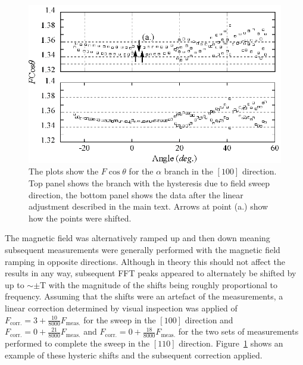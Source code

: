 \begin{figure}[htbp]
    \begin{center}
        \includegraphics[scale=0.9]{Chapter-dHvABaFe2P2/Figures/AngleDepMeasurements/HysteresisCorrection/HysteresisCorrection}
        \caption{The plots show the $F\cos \theta$ for the $\alpha$ branch in the $[100]$ direction. Top panel shows the branch with the hysteresis due to field sweep direction, the bottom panel shows the data after the linear adjustment described in the main text. Arrows at point (a.) show how the points were shifted.}
        \label{Fig:ResD:HysteresisCorrection}
    \end{center}
\end{figure}

The magnetic field was alternatively ramped up and then down meaning subsequent measurements were generally performed with the magnetic field ramping in opposite directions. Although in theory this should not affect the results in any way, subsequent \ac{FFT} peaks appeared to alternately be shifted by up to $\sim\pm$\unit[21]{T} with the magnitude of the shifts being roughly proportional to frequency. Assuming that the shifts were an artefact of the measurements, a linear correction determined by visual inspection was applied of $F_{\textrm{corr.}} = 3 + \frac{10}{8000} F_{\textrm{meas.}}$ for the sweep in the $[100]$ direction and $F_{\textrm{corr.}} = 0 + \frac{21}{8000}  F_{\textrm{meas.}}$ and  $F_{\textrm{corr.}} = 0 + \frac{18}{8000} F_{\textrm{meas.}}$ for the two sets of measurements performed to complete the sweep in the $[110]$ direction. Figure~\ref{Fig:ResD:HysteresisCorrection} shows an example of these hysteric shifts and the subsequent correction applied.

